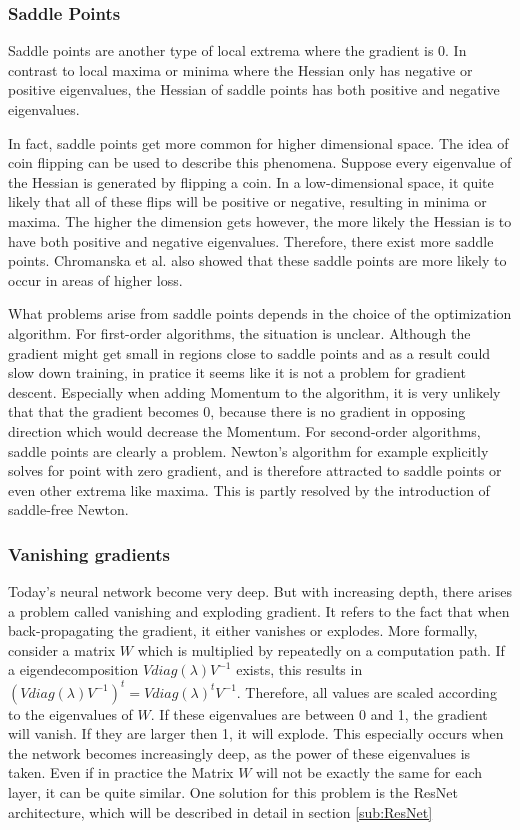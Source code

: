 \subsubsection{Saddle Points}\label{prob:3}
Saddle points are another type of local extrema where the gradient is 0. In
contrast to local maxima or minima where the Hessian only has negative or
positive eigenvalues, the Hessian of saddle points has both positive and
negative eigenvalues.

In fact, saddle points get more common for higher dimensional space. The idea of
coin flipping can be used to describe this phenomena. Suppose every eigenvalue
of the Hessian is generated by flipping a coin. In a low-dimensional space, it
quite likely that all of these flips will be positive or negative, resulting in
minima or maxima. The higher the dimension gets however, the more likely the
Hessian is to have both positive and negative eigenvalues. Therefore, there
exist more saddle points. Chromanska et al. \cite{choromanska2015loss} also
showed that these saddle points are more likely to occur in areas of higher
loss.

What problems arise from saddle points depends in the choice of the optimization
algorithm. For first-order algorithms, the situation is unclear. Although the
gradient might get small in regions close to saddle points and as a result could
slow down training, in pratice it seems like it is not a problem for gradient
descent. Especially when adding Momentum to the algorithm, it is very unlikely
that that the gradient becomes 0, because there is no gradient in opposing
direction which would decrease the Momentum. For second-order algorithms, saddle
points are clearly a problem. Newton's algorithm for example explicitly solves
for point with zero gradient, and is therefore attracted to saddle points or
even other extrema like maxima. This is partly resolved by the introduction of
saddle-free Newton. 


\subsubsection{Vanishing gradients}\label{sub:Vanishing_gradient} Today's neural
network become very deep. But with increasing depth, there arises a problem
called vanishing and exploding gradient. It refers to the fact that when
back-propagating the gradient, it either vanishes or explodes. More formally,
consider a matrix $W$ which is multiplied by repeatedly on a computation path.
If a eigendecomposition $Vdiag(\lambda )V^{-1}$ exists, this results in
$(Vdiag(\lambda )V^{-1})^t=Vdiag(\lambda )^tV^{-1}$. Therefore, all values are
scaled according to the eigenvalues of $W$. If these eigenvalues are between 0
and 1, the gradient will vanish. If they are larger then 1, it will explode.
This especially occurs when the network becomes increasingly deep, as the power
of these eigenvalues is taken. Even if in practice the Matrix $W$ will not be
exactly the same for each layer, it can be quite similar. One solution for this
problem is the ResNet architecture, which will be described in detail in section
\ref{sub:ResNet}

